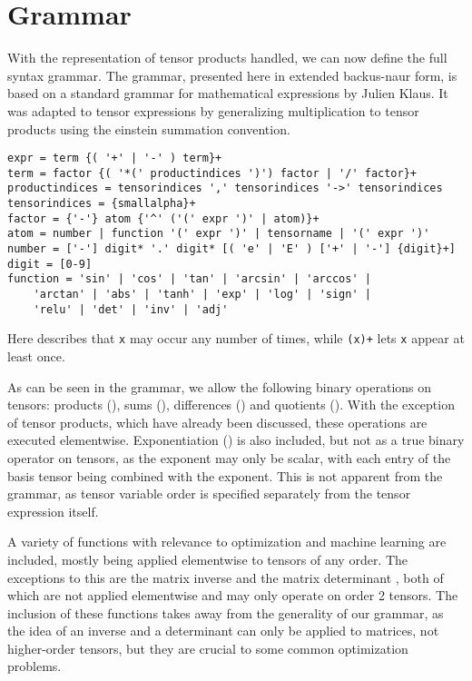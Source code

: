 \documentclass[12pt, a4paper]{report}
\begin{document}
\section{Grammar}
With the representation of tensor products handled, we can now define the full syntax grammar.
The grammar, presented here in extended backus-naur form, is based on a standard grammar for mathematical expressions by Julien Klaus.
It was adapted to tensor expressions by generalizing multiplication to tensor products using the einstein summation convention.
\begin{verbatim}
expr = term {( '+' | '-' ) term}+
term = factor {( '*(' productindices ')') factor | '/' factor}+
productindices = tensorindices ',' tensorindices '->' tensorindices
tensorindices = {smallalpha}+
factor = {'-'} atom {'^' ('(' expr ')' | atom)}+
atom = number | function '(' expr ')' | tensorname | '(' expr ')'
number = ['-'] digit* '.' digit* [( 'e' | 'E' ) ['+' | '-'] {digit}+]
digit = [0-9]
function = 'sin' | 'cos' | 'tan' | 'arcsin' | 'arccos' | 
    'arctan' | 'abs' | 'tanh' | 'exp' | 'log' | 'sign' | 
    'relu' | 'det' | 'inv' | 'adj'
\end{verbatim}
Here \texttt{} describes that \texttt{x} may occur any number of times, while \texttt{(x)+} lets \texttt{x} appear at least once.

As can be seen in the grammar, we allow the following binary operations on tensors: products (\codeword{*(,->)}), sums (\codeword{+}), differences (\codeword{-}) and quotients (\codeword{/}).
With the exception of tensor products, which have already been discussed, these operations are executed elementwise.
Exponentiation (\codeword{^}) is also included, but not as a true binary operator on tensors, as the exponent may only be scalar, with each entry of the basis tensor being combined with the exponent.
This is not apparent from the grammar, as tensor variable order is specified separately from the tensor expression itself.

A variety of functions with relevance to optimization and machine learning are included, mostly being applied elementwise to tensors of any order.
The exceptions to this are the matrix inverse  and the matrix determinant , both of which are not applied elementwise and may only operate on order 2 tensors.
The inclusion of these functions takes away from the generality of our grammar, as the idea of an inverse and a determinant can only be applied to matrices, not higher-order tensors, but they are crucial to some common optimization problems.
\end{document}
